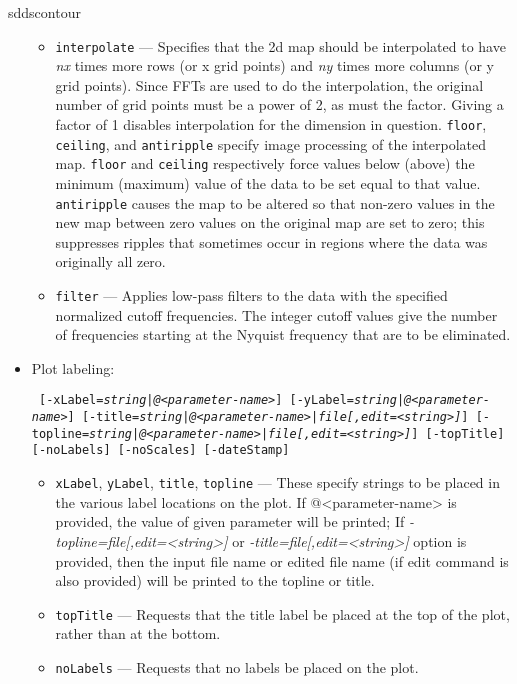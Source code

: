 \begin{sddsprog}{sddscontour}
\begin{itemize}
\begin{itemize}
        \item \verb|interpolate| --- Specifies that the 2d map should be interpolated to have {\em nx} times
        more rows (or x grid points) and {\em ny} times more columns (or y grid points).  Since FFTs are used to
        do the interpolation, the original number of grid points must be a power of 2, as must the factor.  Giving
        a factor of 1 disables interpolation for the dimension in question.  \verb|floor|, \verb|ceiling|,
        and \verb|antiripple| specify image processing of the interpolated map.  \verb|floor| and \verb|ceiling|
        respectively force values below (above) the minimum (maximum) value of the data to be set equal to that
        value.  \verb|antiripple| causes the map to be altered so that non-zero values in the new map between
        zero values on the original map are set to zero; this suppresses ripples that sometimes occur in regions
        where the data was originally all zero.
        \item \verb|filter| --- Applies low-pass filters to the data with the specified normalized cutoff 
        frequencies.  The integer cutoff values give the number of frequencies starting at the Nyquist frequency
        that are to be eliminated.  
        \end{itemize}
    \item Plot labeling:
\begin{flushleft}{\tt
[-xLabel={\em string|@<parameter-name>}] [-yLabel={\em string|@<parameter-name>}] 
[-title={\em string|@<parameter-name>|file[,edit=<string>]}] [-topline={\em string|@<parameter-name>|file[,edit=<string>]}] 
[-topTitle] [-noLabels] [-noScales] [-dateStamp] 
}\end{flushleft}
        \begin{itemize}
        \item \verb|xLabel|, \verb|yLabel|, \verb|title|, \verb|topline| --- These specify strings to be placed
                in the various label locations on the plot. If @<parameter-name> is provided, the value of given parameter will be printed; If {\em-topline=file[,edit=<string>]} or {\em-title=file[,edit=<string>]} option is provided, then the input file name or edited file name (if edit command is also provided) will be printed to the topline or title.
        \item \verb|topTitle| --- Requests that the title label be placed at the top of the plot, rather than
                at the bottom.
        \item \verb|noLabels| --- Requests that no labels be placed on the plot.

\end{itemize}
\end{itemize}
\end{sddsprog}
